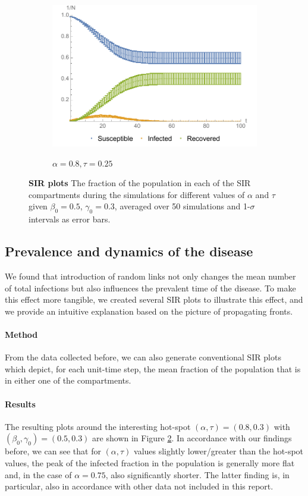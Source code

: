 \documentclass[11pt]{article}
\begin{document}
\begin{figure}[t]
\begin{subfigure}[b]{0.49\textwidth}
    	\includegraphics[width=\textwidth]{sir_alpha08_tau025_omega1_beta05_gamma03_expk2_runs50_notitle.pdf}
        \label{fig:sir_8025}
        \caption{$\alpha=0.8, \tau=0.25$}
	\end{subfigure}
    \caption{\textbf{SIR plots} The fraction of the population in each of the SIR compartments during the simulations for different values of $\alpha$ and $\tau$ given $\beta_{0}=0.5$, $\gamma_{0}=0.3$, averaged over 50 simulations and 1-$\sigma$ intervals as error bars.}
    \label{fig:sir}
\end{figure}


\subsection{Prevalence and dynamics of the disease}

We found that introduction of random links not only changes the mean number of total infections but also influences the prevalent time of the disease. To make this effect more tangible, we created several SIR plots to illustrate this effect, and we provide an intuitive explanation based on the picture of propagating fronts.

\paragraph{Method}
From the data collected before, we can also generate conventional SIR plots which depict, for each unit-time step, the mean fraction of the population that is in either one of the compartments.

\paragraph{Results}
The resulting plots around the interesting hot-spot $(\alpha,\tau) = (0.8,0.3)$ with $(\beta_0,\gamma_0) = (0.5,0.3)$ are shown in Figure \ref{fig:sir}. In accordance with our findings before, we can see that for $(\alpha,\tau)$ values slightly lower/greater than the hot-spot values, the peak of the infected fraction in the population is generally more flat and, in the case of $\alpha = 0.75$, also significantly shorter. The latter finding is, in particular, also in accordance with other data not included in this report.
\end{document}
